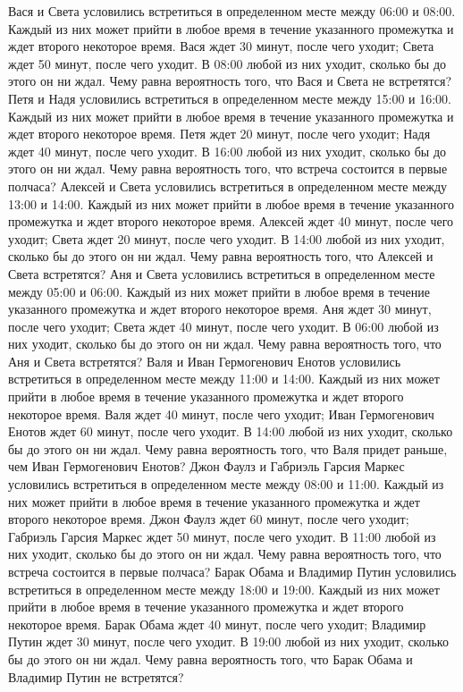 Вася и Света условились встретиться в определенном месте между 06:00 и 08:00. Каждый из них может прийти в любое время в течение указанного промежутка и ждет второго некоторое время. Вася ждет 30 минут, после чего уходит; Света ждет 50 минут, после чего уходит. В 08:00 любой из них уходит, сколько бы до этого он ни ждал. Чему равна вероятность того, что Вася и Света не встретятся?
Петя и Надя условились встретиться в определенном месте между 15:00 и 16:00. Каждый из них может прийти в любое время в течение указанного промежутка и ждет второго некоторое время. Петя ждет 20 минут, после чего уходит; Надя ждет 40 минут, после чего уходит. В 16:00 любой из них уходит, сколько бы до этого он ни ждал. Чему равна вероятность того, что встреча состоится в первые полчаса?
Алексей и Света условились встретиться в определенном месте между 13:00 и 14:00. Каждый из них может прийти в любое время в течение указанного промежутка и ждет второго некоторое время. Алексей ждет 40 минут, после чего уходит; Света ждет 20 минут, после чего уходит. В 14:00 любой из них уходит, сколько бы до этого он ни ждал. Чему равна вероятность того, что Алексей и Света встретятся?
Аня и Света условились встретиться в определенном месте между 05:00 и 06:00. Каждый из них может прийти в любое время в течение указанного промежутка и ждет второго некоторое время. Аня ждет 30 минут, после чего уходит; Света ждет 40 минут, после чего уходит. В 06:00 любой из них уходит, сколько бы до этого он ни ждал. Чему равна вероятность того, что Аня и Света встретятся?
Валя и Иван Гермогенович Енотов условились встретиться в определенном месте между 11:00 и 14:00. Каждый из них может прийти в любое время в течение указанного промежутка и ждет второго некоторое время. Валя ждет 40 минут, после чего уходит; Иван Гермогенович Енотов ждет 60 минут, после чего уходит. В 14:00 любой из них уходит, сколько бы до этого он ни ждал. Чему равна вероятность того, что Валя придет раньше, чем Иван Гермогенович Енотов?
Джон Фаулз и Габриэль Гарсия Маркес условились встретиться в определенном месте между 08:00 и 11:00. Каждый из них может прийти в любое время в течение указанного промежутка и ждет второго некоторое время. Джон Фаулз ждет 60 минут, после чего уходит; Габриэль Гарсия Маркес ждет 50 минут, после чего уходит. В 11:00 любой из них уходит, сколько бы до этого он ни ждал. Чему равна вероятность того, что встреча состоится в первые полчаса?
Барак Обама и Владимир Путин условились встретиться в определенном месте между 18:00 и 19:00. Каждый из них может прийти в любое время в течение указанного промежутка и ждет второго некоторое время. Барак Обама ждет 40 минут, после чего уходит; Владимир Путин ждет 30 минут, после чего уходит. В 19:00 любой из них уходит, сколько бы до этого он ни ждал. Чему равна вероятность того, что Барак Обама и Владимир Путин не встретятся?
